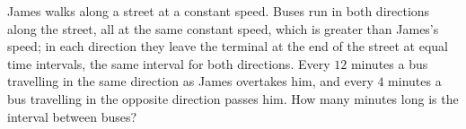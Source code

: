 James walks along a street at a constant speed. Buses run in both directions along the street, all at the same constant speed, which is greater than James's speed; in each direction they leave the terminal at the end of the street at equal time intervals, the same interval for both directions. Every $12$ minutes a bus travelling in the same direction as James overtakes him, and every $4$ minutes a bus travelling in the opposite direction passes him. How many minutes long is the interval between buses?
